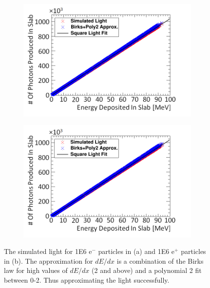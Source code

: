 \begin{figure}[htbp]
\centering
\begin{subfigure}{.5\textwidth}
  \centering
  \includegraphics[width=\linewidth]{Chapter4/Figs/Raster/electronSimulatedLightBirksAndPoly2New.png}
  \captionsetup{width=.9\linewidth}
  \caption{}
  \label{subfig:append5_light_of_electronsLin0-100mev}
\end{subfigure}%
\begin{subfigure}{.5\textwidth}
  \centering
  \includegraphics[width=\linewidth]{Chapter4/Figs/Raster/positronSimulatedLightBirksAndPoly2New.png}
  \captionsetup{width=.9\linewidth}
  \caption{}
  \label{subfig:append5_light_of_positronsLin0-100mev}
\end{subfigure}
\caption{The simulated light for 1E6 e$^-$ particles in (a) and 1E6 e$^+$ particles in (b). The approximation for $dE/dx$ is a combination of the Birks law for high values of $dE/dx$ (2 and above) and a polynomial 2 fit between 0-2. Thus approximating the light successfully.}
\label{fig:append5_light_of_electrons_positronsLin0-100mev}
\end{figure}